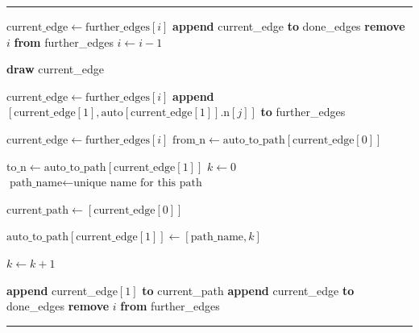 \documentclass[a4paper,12pt,twoside,BCOR=10mm]{scrbook}
\makeatletter
\newenvironment{breakablealgorithm}
  {%
   \begin{center}
     \refstepcounter{algorithm}%
     \hrule height.8pt depth0pt \vspace{-0.45cm} \kern2pt%
     \renewcommand{\caption}[2][\relax]{%
       {\raggedright\textbf{\ALG@name~\thealgorithm} ##2\par}%
       \ifx\relax##1\relax %
         \addcontentsline{loa}{algorithm}{\protect\numberline{\thealgorithm}##2}%
       \else %
         \addcontentsline{loa}{algorithm}{\protect\numberline{\thealgorithm}##1}%
       \fi
       \kern2pt\hrule\kern2pt
     }
  }{%
     \kern2pt\hrule\relax%
   \end{center}
  }
\makeatother
\begin{document}
\begin{breakablealgorithm}
\begin{algorithmic}[1]
\State \phantom{nl}

	\State $ \textrm{current\_edge} \gets \textrm{further\_edges}[ i ] $
		\State \textbf{append} current\_edge \textbf{to} done\_edges
		\State \textbf{remove} $ i $ \textbf{from} further\_edges
		\State $ i \gets i - 1 $

		\State \textbf{draw} current\_edge
	\EndIf
\EndFor

\State \phantom{nl}

	\State $ \textrm{current\_edge} \gets \textrm{further\_edges}[ i ] $
			\State \textbf{append} $ [ \textrm{current\_edge}[ 1 ], \textrm{auto}[ \textrm{current\_edge}[ 1 ] ].\textrm{n}[ j ] ] $ \textbf{to} further\_edges
		\EndIf
	\EndFor
\EndFor

\State \phantom{nl}

		\State $ \textrm{current\_edge} \gets \textrm{further\_edges}[ i ] $
		\State $ \textrm{from\_n} \gets \textrm{auto\_to\_path}[ \textrm{current\_edge}[ 0 ] ] $


			\State $ \textrm{to\_n} \gets \textrm{auto\_to\_path}[ \textrm{current\_edge}[ 1 ] ] $
			\State $ k \gets 0 $
			\State $ \textrm{path\_name} \gets \textrm{unique name for this path} $

			\State $ \textrm{current\_path} \gets [ \textrm{current\_edge}[ 0 ] ] $

				\State $ \textrm{auto\_to\_path}[ \textrm{current\_edge}[ 1 ] ] \gets [ \textrm{path\_name}, k ] $

				\State $ k \gets k + 1 $

				\State \textbf{append} current\_edge$[ 1 ]$ \textbf{to} current\_path
				\State \textbf{append} current\_edge \textbf{to} done\_edges
				\State \textbf{remove} $ i $ \textbf{from} further\_edges


\end{algorithmic}
\end{breakablealgorithm}
\end{document}
